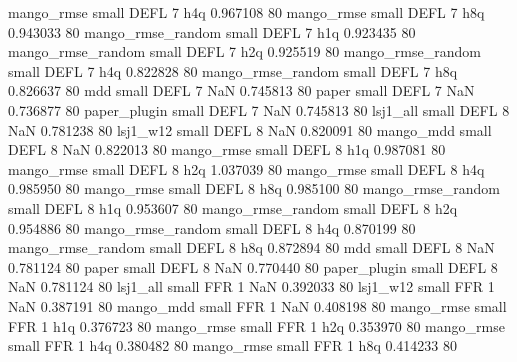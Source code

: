        mango_rmse      small     DEFL                 7                  h4q 0.967108 80
       mango_rmse      small     DEFL                 7                  h8q 0.943033 80
mango_rmse_random      small     DEFL                 7                  h1q 0.923435 80
mango_rmse_random      small     DEFL                 7                  h2q 0.925519 80
mango_rmse_random      small     DEFL                 7                  h4q 0.822828 80
mango_rmse_random      small     DEFL                 7                  h8q 0.826637 80
              mdd      small     DEFL                 7                  NaN 0.745813 80
            paper      small     DEFL                 7                  NaN 0.736877 80
     paper_plugin      small     DEFL                 7                  NaN 0.745813 80
         lsj1_all      small     DEFL                 8                  NaN 0.781238 80
         lsj1_w12      small     DEFL                 8                  NaN 0.820091 80
        mango_mdd      small     DEFL                 8                  NaN 0.822013 80
       mango_rmse      small     DEFL                 8                  h1q 0.987081 80
       mango_rmse      small     DEFL                 8                  h2q 1.037039 80
       mango_rmse      small     DEFL                 8                  h4q 0.985950 80
       mango_rmse      small     DEFL                 8                  h8q 0.985100 80
mango_rmse_random      small     DEFL                 8                  h1q 0.953607 80
mango_rmse_random      small     DEFL                 8                  h2q 0.954886 80
mango_rmse_random      small     DEFL                 8                  h4q 0.870199 80
mango_rmse_random      small     DEFL                 8                  h8q 0.872894 80
              mdd      small     DEFL                 8                  NaN 0.781124 80
            paper      small     DEFL                 8                  NaN 0.770440 80
     paper_plugin      small     DEFL                 8                  NaN 0.781124 80
         lsj1_all      small      FFR                 1                  NaN 0.392033 80
         lsj1_w12      small      FFR                 1                  NaN 0.387191 80
        mango_mdd      small      FFR                 1                  NaN 0.408198 80
       mango_rmse      small      FFR                 1                  h1q 0.376723 80
       mango_rmse      small      FFR                 1                  h2q 0.353970 80
       mango_rmse      small      FFR                 1                  h4q 0.380482 80
       mango_rmse      small      FFR                 1                  h8q 0.414233 80
